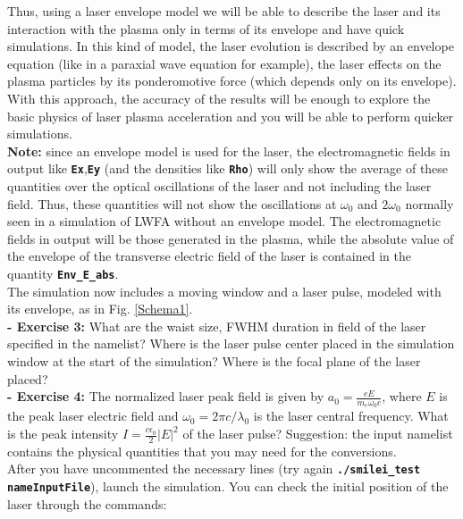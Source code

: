 \documentclass{article}
\newcommand{\commandline}[1]{\texttt{\textbf{#1}}}
\begin{document}
Thus, using a laser envelope model we will be able to describe the laser and its interaction with the plasma only in terms of its envelope and have quick simulations. In this kind of model, the laser evolution is described by an envelope equation (like in a paraxial wave equation for example), the laser effects on the plasma particles by its ponderomotive force (which depends only on its envelope). With this approach, the accuracy of the results will be enough to explore the basic physics of laser plasma acceleration and you will be able to perform quicker simulations. \\

\textbf{ Note:} since an envelope model is used for the laser,  the electromagnetic fields in output like \commandline{Ex},\commandline{Ey} (and the densities like \commandline{Rho}) will only show the average of these quantities over the optical oscillations of the laser and not including the laser field. Thus, these quantities will not show the oscillations at $\omega_0$ and $2\omega_0$ normally seen in a simulation of LWFA without an envelope model. The electromagnetic fields in output will be those generated in the plasma, while the absolute value of the envelope of the transverse electric field of the laser is contained in the quantity \commandline{Env\_E\_abs}. \\

The simulation now includes a moving window and a laser pulse, modeled with its envelope, as in Fig. \ref{Schema1}.\\

\textbf{ - Exercise 3:} What are the waist size, FWHM duration in field of the laser specified in the namelist? Where is the laser pulse center placed in the simulation window at the start of the simulation? Where is the focal plane of the laser placed?\\

\textbf{ - Exercise 4:} The normalized laser peak field is given by $a_0=\frac{eE}{m_e\omega_0 c}$, where $E$ is the peak laser electric field and $\omega_0=2\pi c/\lambda_0$ is the laser central frequency. What is the peak intensity $I=\frac{c\epsilon_0}{2}|E|^2$ of the laser pulse? Suggestion: the input namelist contains the physical quantities that you may need for the conversions.\\

After you have uncommented the necessary lines (try again \commandline{./smilei\_test nameInputFile}), launch the simulation. You can check the initial position of the laser through the commands:\\
\end{document}
